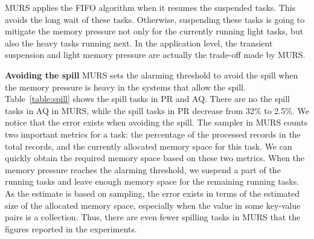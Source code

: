 MURS applies the FIFO algorithm when it resumes the suspended tasks. This avoids the long wait of these tasks. Otherwise, suspending these tasks is going to mitigate the memory pressure not only for the currently running light tasks, but also the heavy tasks running next. In the application level, the transient suspension and light memory pressure are actually the trade-off made by MURS. 


\textbf{Avoiding the spill} MURS sets the alarming threshold to avoid the spill when the memory pressure is heavy in the systems that allow the spill. 
Table~\ref{table:spill} shows the spill tasks in PR and AQ. There are no the spill tasks in AQ in MURS, while the spill tasks in PR decrease from 32\% to 2.5\%.
We notice that the error exists when avoiding the spill. The sampler in MURS counts two important metrics for a task: the percentage of the processed records in the total records, and the currently allocated memory space for this task. We can quickly obtain the required memory space based on these two metrics. When the memory pressure reaches the alarming threshold, we suspend a part of the running tasks and leave enough memory space for the remaining running tasks. As the estimate is based on sampling, the error exists in terms of the estimated size of the allocated memory space, especially when the value in some key-value pairs is a collection. 
Thus, there are even fewer spilling tasks in MURS that the figures reported in the experiments.

